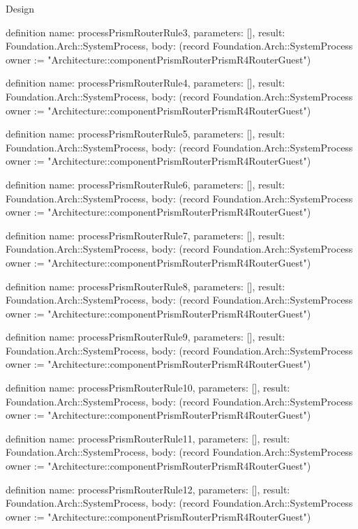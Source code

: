 \begin{lexlean}{Design}
\begin{semanticmodule}
definition{
  name: processPrismRouterRule3,
  parameters: [],
  result: Foundation.Arch::SystemProcess,
  body: (record Foundation.Arch::SystemProcess {owner := "Architecture::componentPrismRouterPrismR4RouterGuest"})
}

definition{
  name: processPrismRouterRule4,
  parameters: [],
  result: Foundation.Arch::SystemProcess,
  body: (record Foundation.Arch::SystemProcess {owner := "Architecture::componentPrismRouterPrismR4RouterGuest"})
}

definition{
  name: processPrismRouterRule5,
  parameters: [],
  result: Foundation.Arch::SystemProcess,
  body: (record Foundation.Arch::SystemProcess {owner := "Architecture::componentPrismRouterPrismR4RouterGuest"})
}

definition{
  name: processPrismRouterRule6,
  parameters: [],
  result: Foundation.Arch::SystemProcess,
  body: (record Foundation.Arch::SystemProcess {owner := "Architecture::componentPrismRouterPrismR4RouterGuest"})
}

definition{
  name: processPrismRouterRule7,
  parameters: [],
  result: Foundation.Arch::SystemProcess,
  body: (record Foundation.Arch::SystemProcess {owner := "Architecture::componentPrismRouterPrismR4RouterGuest"})
}

definition{
  name: processPrismRouterRule8,
  parameters: [],
  result: Foundation.Arch::SystemProcess,
  body: (record Foundation.Arch::SystemProcess {owner := "Architecture::componentPrismRouterPrismR4RouterGuest"})
}

definition{
  name: processPrismRouterRule9,
  parameters: [],
  result: Foundation.Arch::SystemProcess,
  body: (record Foundation.Arch::SystemProcess {owner := "Architecture::componentPrismRouterPrismR4RouterGuest"})
}

definition{
  name: processPrismRouterRule10,
  parameters: [],
  result: Foundation.Arch::SystemProcess,
  body: (record Foundation.Arch::SystemProcess {owner := "Architecture::componentPrismRouterPrismR4RouterGuest"})
}

definition{
  name: processPrismRouterRule11,
  parameters: [],
  result: Foundation.Arch::SystemProcess,
  body: (record Foundation.Arch::SystemProcess {owner := "Architecture::componentPrismRouterPrismR4RouterGuest"})
}

definition{
  name: processPrismRouterRule12,
  parameters: [],
  result: Foundation.Arch::SystemProcess,
  body: (record Foundation.Arch::SystemProcess {owner := "Architecture::componentPrismRouterPrismR4RouterGuest"})
}


\end{semanticmodule}
\end{lexlean}
